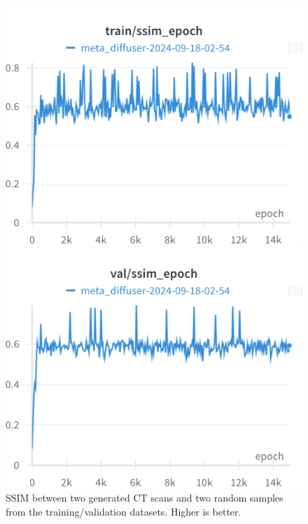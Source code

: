 \begin{figure}[H]
\includegraphics[width=\linewidth]{detailed_engineering/Meta Diffusion/charts/train_ssim_epoch.png}

\endminipage\hfill
{}
\includegraphics[width=\linewidth]{detailed_engineering/Meta Diffusion/charts/val_ssim_epoch.png}

\endminipage
\caption{SSIM between two generated CT scans and two random samples from the training/validation datasets. Higher is better.}
\end{figure}

